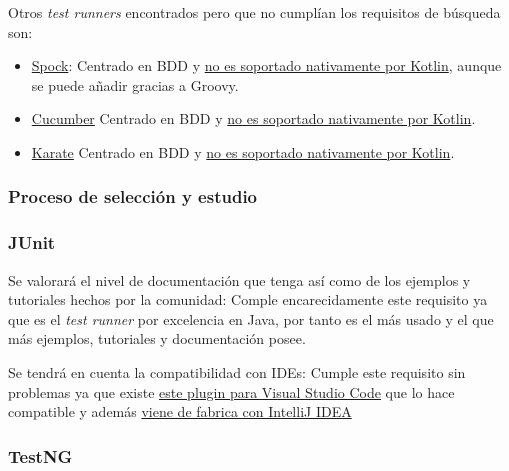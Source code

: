 Otros \emph{test runners} encontrados pero que no cumplían los requisitos de búsqueda son:
\begin{itemize}
    \item \href{https://spockframework.org/}{Spock}: Centrado en BDD y \href{https://kotlinlang.org/api/latest/kotlin.test/}{no es soportado nativamente por Kotlin}, aunque se puede añadir gracias a Groovy.
    \item \href{https://cucumber.io/}{Cucumber} Centrado en BDD y \href{https://kotlinlang.org/api/latest/kotlin.test/}{no es soportado nativamente por Kotlin}.
    \item \href{https://github.com/karatelabs/karate}{Karate} Centrado en BDD y \href{https://kotlinlang.org/api/latest/kotlin.test/}{no es soportado nativamente por Kotlin}.
\end{itemize}


\subsubsection{Proceso de selección y estudio}

\subsubsection{JUnit}

\begin{todolist}
    \item[\xcmark] Se valorará el nivel de documentación que tenga así como de
    los ejemplos y tutoriales hechos por la comunidad: Comple encarecidamente
    este requisito ya que es el \emph{test runner} por excelencia en Java, por
    tanto es el más usado y el que más ejemplos, tutoriales y documentación
    posee.
    \item[\xcmark] Se tendrá en cuenta la compatibilidad con IDEs: Cumple este
    requisito sin problemas ya que existe
    \href{https://code.visualstudio.com/docs/java/java-testing}{este plugin para
    Visual Studio Code} que lo hace compatible y además
    \href{https://www.jetbrains.com/help/idea/junit.html}{viene de fabrica con
    IntelliJ IDEA}
\end{todolist}


\subsubsection{TestNG}

